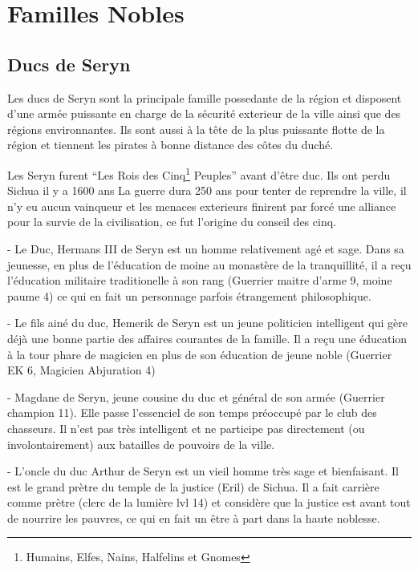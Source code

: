 \section{Familles Nobles}

\subsection*{Ducs de Seryn}

Les ducs de Seryn sont la principale famille possedante de la région et disposent
d'une armée puissante en charge de la sécurité exterieur de la ville ainsi que
des régions environnantes. Ils sont aussi à la tête de la plus puissante flotte de 
la région et tiennent les pirates à bonne distance des côtes du duché.

Les Seryn furent ``Les Rois des Cinq\footnote{Humains, Elfes, Nains, Halfelins 
et Gnomes} Peuples'' avant d'être duc. Ils ont perdu Sichua il y a 1600 ans  
La guerre dura 250 ans pour tenter de reprendre la ville, il n'y eu aucun 
vainqueur et les menaces exterieurs finirent par forcé une alliance pour la
survie de la civilisation, ce fut l'origine du conseil des cinq.

- Le Duc, Hermans III de Seryn est un homme relativement agé et sage. Dans sa
  jeunesse, en plus de l'éducation de moine au monastère de la tranquillité,
  il a reçu l'éducation militaire traditionelle à son rang 
  (Guerrier maitre d'arme 9, moine paume 4)
  ce qui en fait un personnage parfois étrangement philosophique.

- Le fils ainé du duc, Hemerik de Seryn est un jeune politicien intelligent 
  qui gère déjà une bonne partie des affaires courantes de la famille. Il
  a reçu une éducation à la tour phare de magicien en plus de son éducation
  de jeune noble (Guerrier EK 6, Magicien Abjuration 4)

- Magdane de Seryn, jeune cousine du duc et général de son armée 
  (Guerrier champion 11). Elle passe
  l'essenciel de son temps préoccupé par le club des chasseurs. Il n'est
  pas très intelligent et ne participe pas directement (ou involontairement)
  aux batailles de pouvoirs de la ville.

- L'oncle du duc Arthur de Seryn est un vieil homme très sage et bienfaisant.
  Il est le grand prètre du temple de la justice (Eril) de Sichua. Il a fait
  carrière comme prètre (clerc de la lumière lvl 14) et considère que la 
  justice est avant tout de nourrire les pauvres, ce qui en fait un être à
  part dans la haute noblesse.

